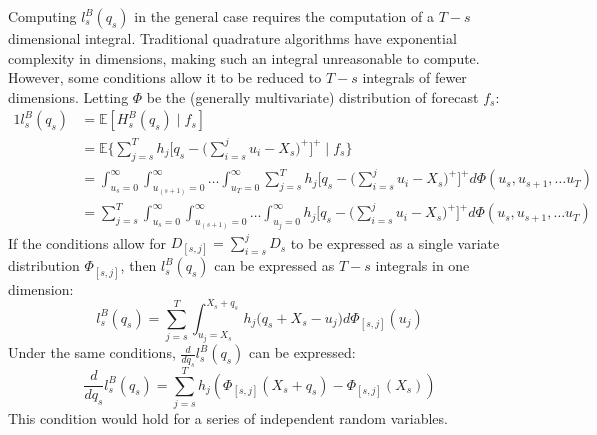 \documentclass[12pt]{report}
\newcommand{\EX}{\mathbb{E}}
\begin{document}
Computing $l_s^B(q_s)$ in the general case requires the computation of a $T - s$ dimensional integral. Traditional quadrature algorithms have exponential complexity in dimensions, making such an integral unreasonable to compute. However, some conditions allow it to be reduced to $T-s$ integrals of fewer dimensions. Letting $\Phi$ be the (generally multivariate) distribution of forecast $f_s$: 
\begin{alignat*}{1}
	l_s^B(q_s) &= \EX [H_s^B(q_s) \; | \; f_s] \\
        &= \EX \bigg\{\sum_{j=s}^T h_j\bigg[q_s - \bigg(\sum_{i=s}^j u_i - X_s\bigg)^+\bigg]^+  \; | \; f_s \bigg\} \\
		&= \int_{u_s=0}^{\infty} \int_{u_{(s+1)}=0}^{\infty}\dots \int_{u_T=0}^{\infty}\sum_{j=s}^T h_j\bigg[q_s - \bigg(\sum_{i=s}^j u_i - X_s\bigg)^+\bigg]^+ d\Phi(u_s, u_{s+1}, \dots u_T)\\
	   &= \sum_{j=s}^T \int_{u_s=0}^{\infty} \int_{u_{(s+1)}=0}^{\infty}\dots \int_{u_j=0}^{\infty} h_j\bigg[q_s - \bigg(\sum_{i=s}^j u_i - X_s\bigg)^+\bigg]^+ d\Phi(u_s, u_{s+1}, \dots u_T)
\end{alignat*}
If the conditions allow for $D_{[s, j]} = \sum_{i=s}^j D_s$ to be expressed as a single variate distribution $\Phi_{[s, j]}$, then $l_s^B(q_s)$ can be expressed as $T - s$ integrals in one dimension:
\begin{equation}
	l_s^B(q_s) = \sum_{j=s}^T \int_{u_j=X_s}^{X_s + q_s} h_j\bigg(q_s + X_s - u_j \bigg) d\Phi_{[s, j]}(u_j)
\end{equation}
Under the same conditions, $\frac{d}{d q_s} l_s^B(q_s)$ can be expressed:
\begin{equation}
	\frac{d}{d q_s} l_s^B(q_s) =  \sum_{j=s}^T h_j (\Phi_{[s, j]}(X_s + q_s) - \Phi_{[s, j]}(X_s))
\end{equation}
This condition would hold for a series of independent random variables. 
\end{document}
